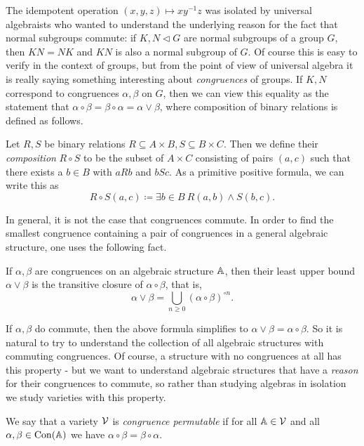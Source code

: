 \documentclass[letterpaper,11pt]{article}
\DeclareMathOperator{\Con}{Con}
\begin{document}
The idempotent operation $(x,y,z) \mapsto xy^{-1}z$ was isolated by universal algebraists who wanted to understand the underlying reason for the fact that normal subgroups commute: if $K,N\lhd G$ are normal subgroups of a group $G$, then $KN = NK$ and $KN$ is also a normal subgroup of $G$. Of course this is easy to verify in the context of groups, but from the point of view of universal algebra it is really saying something interesting about \emph{congruences} of groups. If $K,N$ correspond to congruences $\alpha, \beta$ on $G$, then we can view this equality as the statement that $\alpha \circ \beta = \beta \circ \alpha = \alpha\vee\beta$, where composition of binary relations is defined as follows.

\begin{defn} Let $R,S$ be binary relations $R \subseteq A\times B, S\subseteq B\times C$. Then we define their \emph{composition} $R\circ S$ to be the subset of $A\times C$ consisting of pairs $(a,c)$ such that there exists a $b \in B$ with $aRb$ and $bSc$. As a primitive positive formula, we can write this as
\[
R\circ S(a,c) \coloneqq \exists b\in B\ R(a,b) \wedge S(b,c).
\]
\end{defn}

In general, it is not the case that congruences commute. In order to find the smallest congruence containing a pair of congruences in a general algebraic structure, one uses the following fact.

\begin{prop} If $\alpha,\beta$ are congruences on an algebraic structure $\mathbb{A}$, then their least upper bound $\alpha \vee \beta$ is the transitive closure of $\alpha \circ \beta$, that is,
\[
\alpha \vee \beta = \bigcup_{n \ge 0} (\alpha \circ \beta)^{\circ n}.
\]
\end{prop}

If $\alpha,\beta$ do commute, then the above formula simplifies to $\alpha \vee \beta = \alpha \circ \beta$. So it is natural to try to understand the collection of all algebraic structures with commuting congruences. Of course, a structure with no congruences at all has this property - but we want to understand algebraic structures that have a \emph{reason} for their congruences to commute, so rather than studying algebras in isolation we study varieties with this property.

\begin{defn} We say that a variety $\mathcal{V}$ is \emph{congruence permutable} if for all $\mathbb{A} \in \mathcal{V}$ and all $\alpha, \beta \in \Con(\bA)$ we have $\alpha \circ \beta = \beta \circ \alpha$.
\end{defn}
\end{document}
